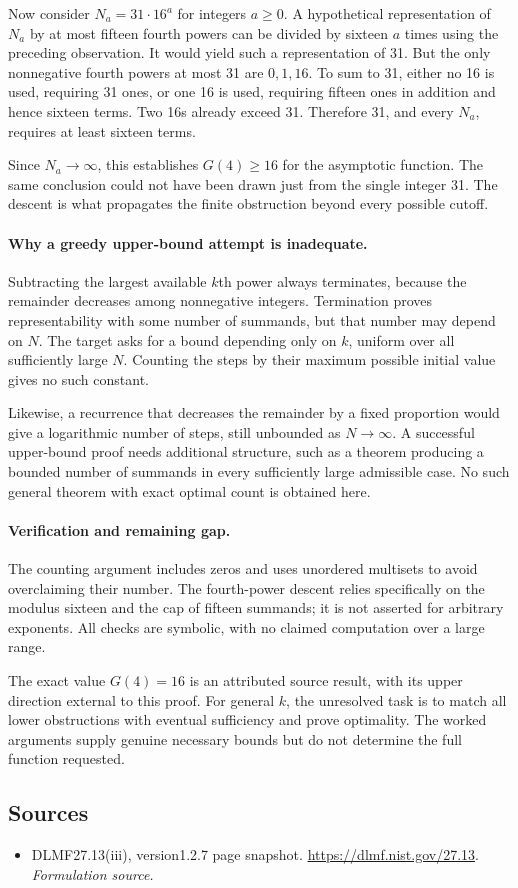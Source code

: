 \documentclass[11pt]{article}
\begin{document}
Now consider $N_a=31\cdot16^a$ for integers $a\ge0$. A hypothetical representation of $N_a$ by at most fifteen fourth powers can be divided by sixteen $a$ times using the preceding observation. It would yield such a representation of 31. But the only nonnegative fourth powers at most 31 are $0,1,16$. To sum to 31, either no 16 is used, requiring 31 ones, or one 16 is used, requiring fifteen ones in addition and hence sixteen terms. Two 16s already exceed 31. Therefore 31, and every $N_a$, requires at least sixteen terms.

Since $N_a\to\infty$, this establishes $G(4)\ge16$ for the asymptotic function. The same conclusion could not have been drawn just from the single integer 31. The descent is what propagates the finite obstruction beyond every possible cutoff.

\paragraph{Why a greedy upper-bound attempt is inadequate.}
Subtracting the largest available $k$th power always terminates, because the remainder decreases among nonnegative integers. Termination proves representability with some number of summands, but that number may depend on $N$. The target asks for a bound depending only on $k$, uniform over all sufficiently large $N$. Counting the steps by their maximum possible initial value gives no such constant.

Likewise, a recurrence that decreases the remainder by a fixed proportion would give a logarithmic number of steps, still unbounded as $N\to\infty$. A successful upper-bound proof needs additional structure, such as a theorem producing a bounded number of summands in every sufficiently large admissible case. No such general theorem with exact optimal count is obtained here.

\paragraph{Verification and remaining gap.}
The counting argument includes zeros and uses unordered multisets to avoid overclaiming their number. The fourth-power descent relies specifically on the modulus sixteen and the cap of fifteen summands; it is not asserted for arbitrary exponents. All checks are symbolic, with no claimed computation over a large range.

The exact value $G(4)=16$ is an attributed source result, with its upper direction external to this proof. For general $k$, the unresolved task is to match all lower obstructions with eventual sufficiency and prove optimality. The worked arguments supply genuine necessary bounds but do not determine the full function requested.

\subsection{Sources}
\begin{itemize}
\item[S1]DLMF27.13(iii), version1.2.7 page snapshot.
\url{https://dlmf.nist.gov/27.13}.
\textit{Formulation source.}
\end{itemize}
\end{document}
